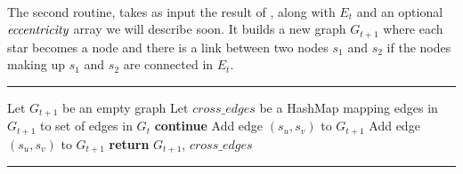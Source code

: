 \medskip

\paragraph{\collapseStar{}}\label{par:collapsestar}%
The second routine, \collapseStar{} takes as input the result of \extractStar{}, along with $E_t$
and an optional $\emph{eccentricity}$ array we will describe soon. It builds a new graph $G_{t+1}$
where each star becomes a node and there is a link between two nodes $s_1$ and $s_2$ if the nodes
making up $s_1$ and $s_2$ are connected in $E_t$.

\begin{center}
  \rule{\textwidth}{.3pt}
  \begin{algorithmic}[1]
      \State Let $G_{t+1}$ be an empty graph
      \State Let $cross\_edges$ be a HashMap mapping edges in $G_{t+1}$ to set of edges in $G_t$
          \State \textbf{continue}
        \EndIf
          \State Add edge $(s_u, s_v)$ to $G_{t+1}$
        \EndIf
      \EndFor
          \State Add edge $(s_u, s_v)$ to $G_{t+1}$
        \EndFor
      \EndIf
      \State \textbf{return} $G_{t+1}$, $cross\_edges$
    \EndFunction
  \end{algorithmic}
  \rule{\textwidth}{.3pt}
\end{center}

